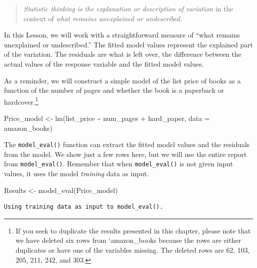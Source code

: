 \documentclass[
  letterpaper,
  DIV=11,
  numbers=noendperiod,
  oneside]{scrreprt}
\newenvironment{Shaded}{\begin{snugshade}}{\end{snugshade}}
\newcommand{\AttributeTok}[1]{\textcolor[rgb]{0.40,0.45,0.13}{#1}}
\newcommand{\FunctionTok}[1]{\textcolor[rgb]{0.28,0.35,0.67}{#1}}
\newcommand{\NormalTok}[1]{\textcolor[rgb]{0.00,0.23,0.31}{#1}}
\newcommand{\OtherTok}[1]{\textcolor[rgb]{0.00,0.23,0.31}{#1}}
\newcommand{\SpecialCharTok}[1]{\textcolor[rgb]{0.37,0.37,0.37}{#1}}
\begin{document}
\begin{quote}
\emph{Statistic thinking is the explanation or description of variation}
in the context of \emph{what remains unexplained or undescribed.}
\end{quote}

In this Lesson, we will work with a straightforward measure of ``what
remains unexplained or undescribed.'' The fitted model values represent
the explained part of the variation. The residuals are what is left
over, the difference between the actual values of the response variable
and the fitted model values.

As a reminder, we will construct a simple model of the list price of
books as a function of the number of pages and whether the book is a
paperback or hardcover.\footnote{If you seek to duplicate the results
  presented in this chapter, please note that we have deleted six rows
  from `amazon\_books because the rows are either duplicates or have one
  of the variables missing. The deleted rows are 62, 103, 205, 211, 242,
  and 303.}

\begin{Shaded}
\begin{Highlighting}[]
\NormalTok{Price\_model }\OtherTok{\textless{}{-}} \FunctionTok{lm}\NormalTok{(list\_price }\SpecialCharTok{\textasciitilde{}}\NormalTok{ num\_pages }\SpecialCharTok{+}\NormalTok{ hard\_paper, }
                  \AttributeTok{data =}\NormalTok{ amazon\_books)}
\end{Highlighting}
\end{Shaded}

The \texttt{model\_eval()} function can extract the fitted model values
and the residuals from the model. We show just a few rows here, but we
will use the entire report from \texttt{model\_eval()}. Remember that
when \texttt{model\_eval()} is not given input values, it uses the model
\emph{training} data as input.

\begin{Shaded}
\begin{Highlighting}[]
\NormalTok{Results }\OtherTok{\textless{}{-}} \FunctionTok{model\_eval}\NormalTok{(Price\_model)}
\end{Highlighting}
\end{Shaded}

\begin{verbatim}
Using training data as input to model_eval().
\end{verbatim}
\end{document}

